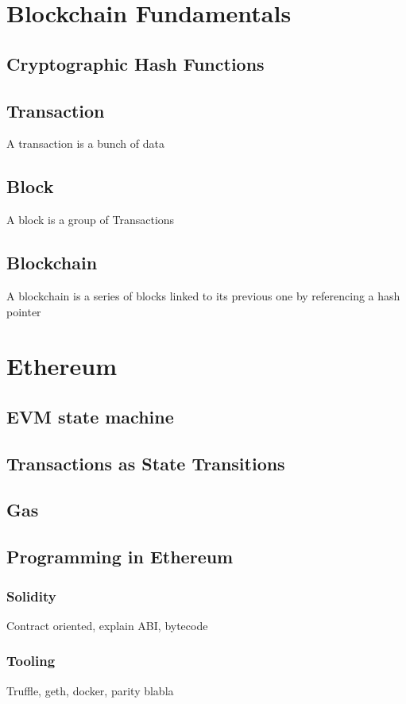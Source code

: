 \section{Blockchain Fundamentals}
\subsection{Cryptographic Hash Functions}
\subsection{Transaction}
A transaction is a bunch of data 
\subsection{Block}
A block is a group of Transactions
\subsection{Blockchain}
A blockchain is a series of blocks linked to its previous one by referencing a hash pointer 


\section{Ethereum}

\subsection{EVM state machine}

\subsection{Transactions as State Transitions}

\subsection{Gas}

\subsection{Programming in Ethereum}
\subsubsection{Solidity}
Contract oriented, explain ABI, bytecode

\subsubsection{Tooling}
Truffle, geth, docker, parity blabla
